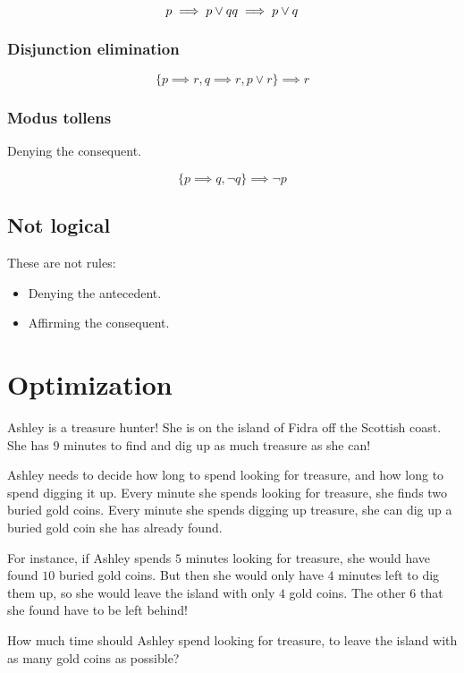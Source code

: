 \documentclass[a4paper,10pt]{report}
\begin{document}
\begin{equation*}
 p \implies p \lor q \\
 q \implies p \lor q
\end{equation*}

\subsection{Disjunction elimination}

\begin{equation*}
 \{p \implies r, q \implies r, p \lor r\} \implies r
\end{equation*}

\subsection{Modus tollens}

Denying the consequent.

\begin{equation*}
 \{p \implies q, \lnot q\} \implies \lnot p
\end{equation*}

\section{Not logical}
These are not rules:

\begin{itemize}
 \item Denying the antecedent.
 \item Affirming the consequent.
\end{itemize}

\chapter{Optimization}

\begin{problem}{3}
  Ashley is a treasure hunter! She is on the island of Fidra off the Scottish coast. She
  has \(9\) minutes to find and dig up as much treasure as she can!

  Ashley needs to decide how long to spend looking for treasure, and how long to spend
  digging it up. Every minute she spends looking for treasure, she finds two buried gold
  coins. Every minute she spends digging up treasure, she can dig up a buried gold coin she
  has already found.

  For instance, if Ashley spends \(5\) minutes looking for treasure, she would have found
  \(10\) buried gold coins. But then she would only have \(4\) minutes left to dig them up,
  so she would leave the island with only \(4\) gold coins. The other \(6\) that she found
  have to be left behind!

  How much time should Ashley spend looking for treasure, to leave the island with as many
  gold coins as possible?
\end{problem}


\printglossaries

\cleardoublepage
{}
\listoffigures
\end{document}
